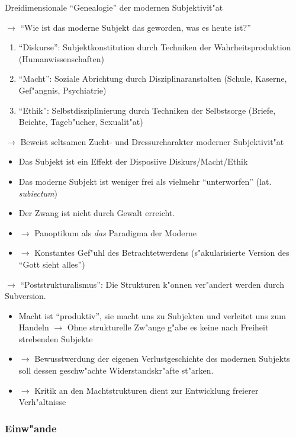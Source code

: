 \documentclass[emulatestandardclasses]{scrartcl}
\begin{document}
Dreidimensionale "`Genealogie"' der modernen Subjektivit"at

$\rightarrow$ "`Wie ist das moderne Subjekt das geworden, was es heute ist?"'

\begin{enumerate}
  \item "`Diskurse"': Subjektkonstitution durch Techniken der Wahrheitsproduktion (Humanwissenschaften)
  \item "`Macht"': Soziale Abrichtung durch Disziplinaranstalten (Schule, Kaserne, Gef"angnis, Psychiatrie)
  \item "`Ethik"': Selbstdisziplinierung durch Techniken der Selbstsorge (Briefe, Beichte, Tageb"ucher, Sexualit"at)
\end{enumerate}

$\rightarrow$ Beweist seltsamen Zucht- und Dressurcharakter moderner Subjektivit"at

\begin{itemize}
  \item Das Subjekt ist ein Effekt der Disposiive Diskurs/Macht/Ethik
  \item Das moderne Subjekt ist weniger frei als vielmehr "`unterworfen"' (lat. \emph{subiectum})
  \item Der Zwang ist nicht durch Gewalt erreicht.
  \item $\rightarrow$ Panoptikum als \emph{das} Paradigma der Moderne
  \item $\rightarrow$ Konstantes Gef"uhl des Betrachtetwerdens (s"akularisierte Version des "`Gott sieht alles"')
\end{itemize}

$\rightarrow$ "`Poststrukturalismus"': Die Strukturen k"onnen ver"andert werden durch Subversion.

\begin{itemize}
  \item Macht ist "`produktiv"', sie macht uns zu Subjekten und verleitet uns zum Handeln $\rightarrow$ Ohne strukturelle Zw"ange g"abe es keine nach Freiheit strebenden Subjekte
  \item $\rightarrow$ Bewusstwerdung der eigenen Verlustgeschichte des modernen Subjekts soll dessen geschw"achte Widerstandskr"afte st"arken.
  \item $\rightarrow$ Kritik an den Machtstrukturen dient zur Entwicklung freierer Verh"altnisse
\end{itemize}

\subsubsection{Einw"ande}
\end{document}
